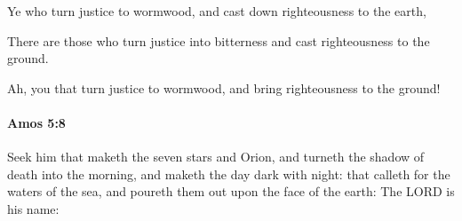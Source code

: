 			\begin{versebox}
					\item[BHS] 
					\item[LXX] 
					\item[ASV] Ye who turn justice to wormwood, and cast down righteousness to the earth,
					\item[NIV] There are those who turn justice into bitterness and cast righteousness to the ground.
					\item[NRSV] Ah, you that turn justice to wormwood, and bring righteousness to the ground!
			\end{versebox}

		\paragraph{Amos 5:8} %
			\label{AMOS-5-8}

			Seek him that maketh the seven stars and Orion, and turneth the shadow of death into the morning, and maketh the day dark with night: that calleth for the waters of the sea, and poureth them out upon the face of the earth: The LORD is his name:

